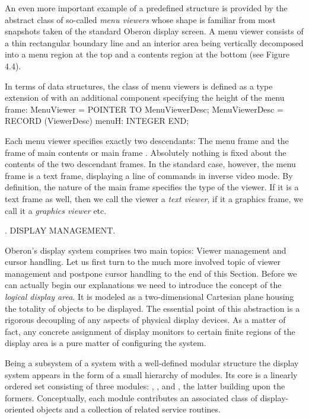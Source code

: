 An even more important example of a predefined structure is provided
by the abstract class of so-called \emph{menu viewers} whose shape is
familiar from most snapshots taken of the standard Oberon display
screen. A menu viewer consists of a thin rectangular boundary line and
an interior area being vertically decomposed into a menu region at the
top and a contents region at the bottom (see Figure 4.4).


In terms of data structures, the class of menu viewers is defined as a
type extension of  with an additional component 
specifying the height of the menu frame:
\begintt
MenuViewer = POINTER TO MenuViewerDesc;
MenuViewerDesc = RECORD (ViewerDesc)
  menuH: INTEGER
END;
\endtt

\noindent Each menu viewer  specifies exactly two
descendants: The menu frame  and the frame of main
contents or main frame . Absolutely nothing is fixed
about the contents of the two descendant frames. In the standard case,
however, the menu frame is a text frame, displaying a line of commands
in inverse video mode. By definition, the nature of the main frame
specifies the type of the viewer. If it is a text frame as well, then
we call the viewer a \emph{text viewer}, if it a graphics frame, we call it a
\emph{graphics viewer} etc.

. DISPLAY MANAGEMENT.

Oberon's display system comprises two main topics: Viewer management
and cursor handling. Let us first turn to the much more involved topic
of viewer management and postpone cursor handling to the end of this
Section. Before we can actually begin our explanations we need to
introduce the concept of the \emph{logical display area}. It is modeled as a
two-dimensional Cartesian plane housing the totality of objects to be
displayed. The essential point of this abstraction is a rigorous
decoupling of any aspects of physical display devices. As a matter of
fact, any concrete assignment of display monitors to certain finite
regions of the display area is a pure matter of configuring the
system.

Being a subsystem of a system with a well-defined modular structure
the display system appears in the form of a small hierarchy of
modules. Its core is a linearly ordered set consisting of three
modules: , , and , the latter building upon
the formers. Conceptually, each module contributes an associated class
of display-oriented objects and a collection of related service
routines.

